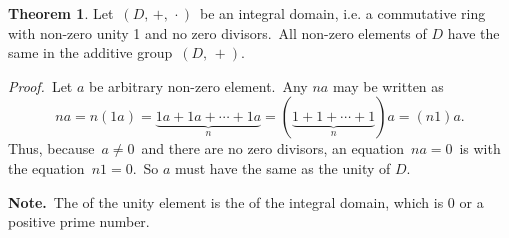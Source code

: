 \documentclass[12pt]{article}
\theoremstyle{definition}
\newtheorem*{thmplain}{Theorem}
\begin{document}
\begin{thmplain}
Let\, $(D,\,+,\,\cdot)$\, be an integral domain, i.e. a commutative ring with non-zero unity 1 and no zero divisors.\, All non-zero elements of $D$ have the same  in the additive group\, $(D,\,+)$.
\end{thmplain}

{\em Proof.}\, Let $a$ be arbitrary non-zero element.\, Any  $na$ may be  written as
  $$na = n(1a) = \underbrace{1a+1a+\cdots+1a}_{n} = (\underbrace{1+1+\cdots+1}_{n})a = (n1)a.$$
Thus, because\, $a \ne 0$\, and there are no zero divisors, an equation\, $na = 0$\, is  with the equation\, $n1 = 0$.\, So $a$ must have the same  as the unity of $D$.

\textbf{Note.}\, The  of the unity element is the  of the integral domain, which is 0 or a positive prime number.
\end{document}
